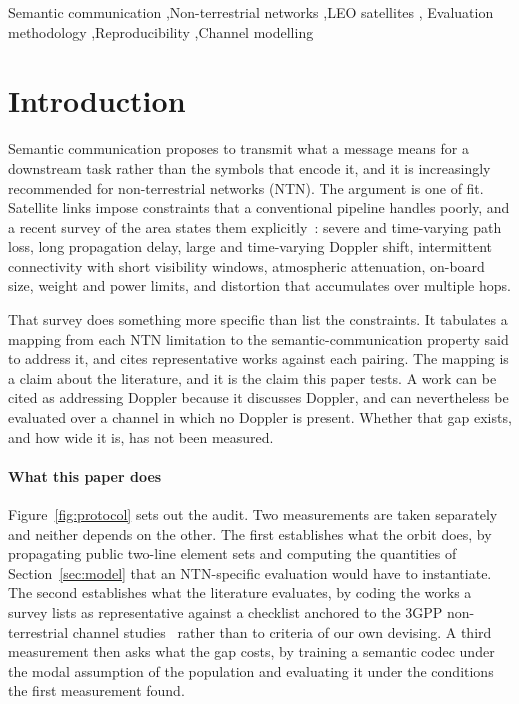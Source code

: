 \documentclass[preprint,11pt,3p]{elsarticle}
\begin{document}
\begin{frontmatter}
\begin{keyword}
Semantic communication \sep Non-terrestrial networks \sep LEO satellites \sep
Evaluation methodology \sep Reproducibility \sep Channel modelling
\end{keyword}

\end{frontmatter}

\section{Introduction}

Semantic communication proposes to transmit what a message means for a downstream task rather
than the symbols that encode it, and it is increasingly recommended for non-terrestrial networks
(NTN). The argument is one of fit. Satellite links impose constraints that a conventional
pipeline handles poorly, and a recent survey of the area states them explicitly~\cite{survey2026ntnsemcom}: severe and
time-varying path loss, long propagation delay, large and time-varying Doppler shift,
intermittent connectivity with short visibility windows, atmospheric attenuation, on-board size,
weight and power limits, and distortion that accumulates over multiple hops.

That survey does something more specific than list the constraints. It tabulates a mapping from
each NTN limitation to the semantic-communication property said to address it, and cites
representative works against each pairing. The mapping is a claim about the literature, and it is
the claim this paper tests. A work can be cited as addressing Doppler because it discusses
Doppler, and can nevertheless be evaluated over a channel in which no Doppler is present. Whether
that gap exists, and how wide it is, has not been measured.

\paragraph{What this paper does}
Figure~\ref{fig:protocol} sets out the audit. Two measurements are taken separately and neither
depends on the other. The first establishes what the orbit does, by propagating public two-line
element sets and computing the quantities of Section~\ref{sec:model} that an NTN-specific
evaluation would have to instantiate.
The second establishes what the literature evaluates, by coding the works a survey lists as
representative against a checklist anchored to the 3GPP non-terrestrial channel studies~\cite{tr38821} rather
than to criteria of our own devising. A third measurement then asks what the gap costs, by
training a semantic codec under the modal assumption of the population and evaluating it under
the conditions the first measurement found.
\end{document}

